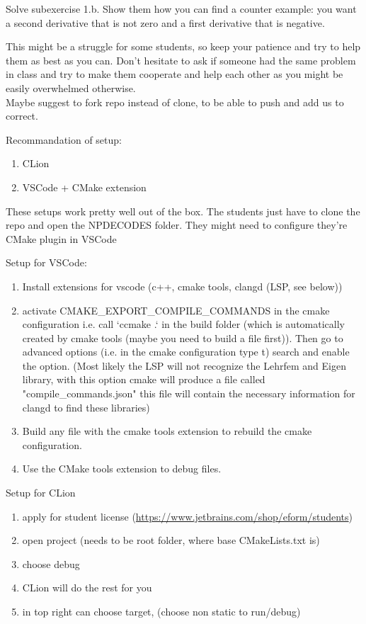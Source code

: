 
Solve subexercise 1.b. Show them how you can find a counter example: you want a second derivative that is not zero and a first derivative that is negative.


This might be a struggle for some students, so keep your patience and try to help them as best as you can. Don't hesitate to ask if someone had the same problem in class and try to make them cooperate and help each other as you might be easily overwhelmed otherwise.\\
Maybe suggest to fork repo instead of clone, to be able to push and add us to correct.

Recommandation of setup:
\begin{enumerate}
    \item CLion
    \item VSCode + CMake extension
\end{enumerate}

These setups work pretty well out of the box. The students just have to clone the repo and open the NPDECODES folder. They might need to configure they're CMake plugin in VSCode



Setup for VSCode:
\begin{enumerate}
    \item Install extensions for vscode (c++, cmake tools, clangd (LSP, see below))
    \item activate CMAKE\_EXPORT\_COMPILE\_COMMANDS in the cmake configuration i.e. call `ccmake .` in
    the build folder (which is automatically created by cmake tools (maybe you need to build a file first)).
    Then go to advanced options (i.e. in the cmake configuration type t) search and enable the option.
    (Most likely the  LSP will not recognize the Lehrfem and Eigen library, with this option cmake will produce a file 
    called "compile\_commands.json" this file will contain the necessary information for clangd to find these libraries)
    \item Build any file with the cmake tools extension to rebuild the cmake configuration.    
    \item Use the CMake tools extension to debug files.
\end{enumerate}

Setup for CLion
\begin{enumerate}
    \item apply for student license (\url{https://www.jetbrains.com/shop/eform/students})
    \item open project (needs to be root folder, where base CMakeLists.txt is)
    \item choose debug
    \item CLion will do the rest for you
    \item in top right can choose target, (choose non static to run/debug)
\end{enumerate}

